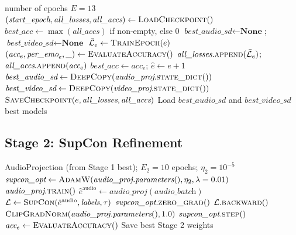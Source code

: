 \documentclass[12pt,a4paper]{article}
\theoremstyle{definition}
\theoremstyle{remark}
\begin{document}
\begin{algorithm}[H]
\caption{Stage 1: Full Cross-Modal InfoNCE Training}
\label{alg:stage1}
\begin{algorithmic}[1]
\Require number of epochs $E = 13$
\State $(\textit{start\_epoch}, \textit{all\_losses}, \textit{all\_accs})
    \gets \textsc{LoadCheckpoint}()$
\State $\textit{best\_acc} \gets \max(\textit{all\_accs})$ if non-empty, else 0
\State $\textit{best\_audio\_sd} \gets \textbf{None}$; $\textit{best\_video\_sd} \gets \textbf{None}$
  \State $\bar{\mathcal{L}}_e \gets \textsc{TrainEpoch}(e)$
  \State $(\textit{acc}_e, \textit{per\_emo}_e, \_) \gets \textsc{EvaluateAccuracy}()$
  \State $\textit{all\_losses}.\textsc{append}(\bar{\mathcal{L}}_e)$;
         $\textit{all\_accs}.\textsc{append}(\textit{acc}_e)$
    \State $\textit{best\_acc} \gets \textit{acc}_e$;
           $\hat{e} \gets e + 1$
    \State $\textit{best\_audio\_sd} \gets \textsc{DeepCopy}(\textit{audio\_proj}.\textsc{state\_dict}())$
    \State $\textit{best\_video\_sd} \gets \textsc{DeepCopy}(\textit{video\_proj}.\textsc{state\_dict}())$
  \EndIf
  \State $\textsc{SaveCheckpoint}(e, \textit{all\_losses}, \textit{all\_accs})$
\EndFor
\State Load $\textit{best\_audio\_sd}$ and $\textit{best\_video\_sd}$
\State \Return best models
\end{algorithmic}
\end{algorithm}

\subsection{Stage 2: SupCon Refinement}

\begin{algorithm}[H]
\caption{Stage 2: Supervised Contrastive Refinement}
\label{alg:stage2}
\begin{algorithmic}[1]
\Require AudioProjection (from Stage 1 best); $E_2 = 10$ epochs; $\eta_2 = 10^{-5}$
\State $\textit{supcon\_opt} \gets \textsc{AdamW}(\textit{audio\_proj.parameters}(),
    \eta_2, \lambda=0.01)$
  \State $\textit{audio\_proj}.\textsc{train}()$
    \State $\hat{e}^{\text{audio}} \gets \textit{audio\_proj}(\textit{audio\_batch})$
    \State $\mathcal{L} \gets \textsc{SupCon}(\hat{e}^{\text{audio}}, \textit{labels}, \tau)$
    \State $\textit{supcon\_opt}.\textsc{zero\_grad}()$
    \State $\mathcal{L}.\textsc{backward}()$
    \State $\textsc{ClipGradNorm}(\textit{audio\_proj.parameters}(), 1.0)$
    \State $\textit{supcon\_opt}.\textsc{step}()$
  \EndFor
  \State $\textit{acc}_e \gets \textsc{EvaluateAccuracy}()$
    \State Save best Stage 2 weights
  \EndIf
\EndFor
\end{algorithmic}
\end{algorithm}
\end{document}
